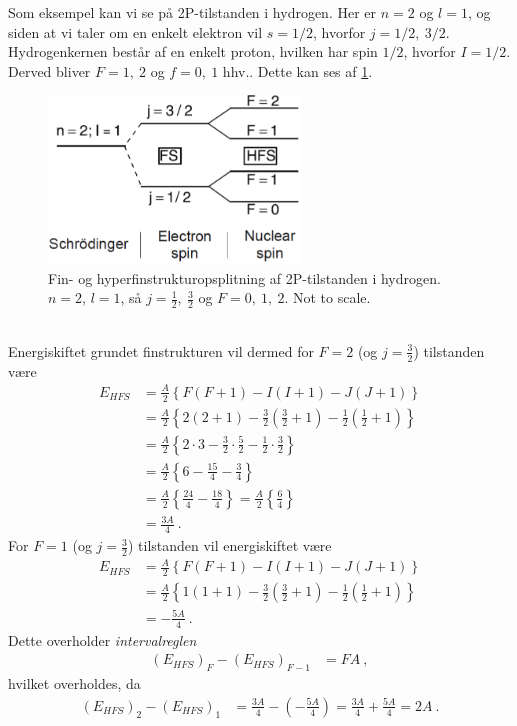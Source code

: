Som eksempel kan vi se på 2P-tilstanden i hydrogen. Her er $n = 2$ og $l = 1$, og siden at vi taler om en enkelt elektron vil $s = 1/2$, hvorfor $j = 1/2,\: 3/2$. Hydrogenkernen består af en enkelt proton, hvilken har spin $1/2$, hvorfor $I = 1/2$. Derved bliver $F = 1,\: 2$ og $f = 0,\: 1$ hhv.. Dette kan ses af \cref{fig:Q16_HyperFineSplittingOf2PstateInHydrogen}.
\begin{figure}[!h]
    \centering
    \includegraphics[width=0.60\textwidth]{Q16/images/HyperFineSplittingOf2PstateInHydrogen.PNG}
    \caption{Fin- og hyperfinstrukturopsplitning af 2P-tilstanden i hydrogen. $n = 2$, $l = 1$, så $j = \frac{1}{2}, \: \frac{3}{2}$ og $F = 0,\: 1,\: 2$. Not to scale.}
    \label{fig:Q16_HyperFineSplittingOf2PstateInHydrogen}
\end{figure}\\
Energiskiftet grundet finstrukturen vil dermed for $F = 2$ (og $j = \frac{3}{2}$) tilstanden være
\begin{align}
    E_{HFS} &= \frac{A}{2} \left\{F(F+1) - I(I+1) - J(J+1)\right\} \nonumber\\
    &= \frac{A}{2} \left\{2(2+1) - \frac{3}{2}(\frac{3}{2}+1) - \frac{1}{2}(\frac{1}{2}+1)\right\} \nonumber\\
    &= \frac{A}{2} \left\{2 \cdot 3 - \frac{3}{2} \cdot \frac{5}{2} - \frac{1}{2} \cdot \frac{3}{2}\right\} \nonumber\\
    &= \frac{A}{2} \left\{6 - \frac{15}{4} - \frac{3}{4}\right\} \nonumber\\
    &= \frac{A}{2} \left\{\frac{24}{4} - \frac{18}{4}\right\}
    = \frac{A}{2} \left\{\frac{6}{4}\right\} \nonumber\\
    &= \frac{3A}{4} \: .
\end{align}
For $F = 1$ (og $j = \frac{3}{2}$) tilstanden vil energiskiftet være
\begin{align}
    E_{HFS} &= \frac{A}{2} \left\{F(F+1) - I(I+1) - J(J+1)\right\} \nonumber\\
    &= \frac{A}{2} \left\{1(1+1) - \frac{3}{2}(\frac{3}{2}+1) - \frac{1}{2}(\frac{1}{2}+1)\right\} \nonumber\\
    &= -\frac{5A}{4} \: .
\end{align}
Dette overholder \emph{intervalreglen}
\begin{align}
    (E_{HFS})_F - (E_{HFS})_{F-1} &= FA \: ,
\end{align}
hvilket overholdes, da
\begin{align}
    (E_{HFS})_2 - (E_{HFS})_1 &= \frac{3A}{4} - \left(-\frac{5A}{4}\right) = \frac{3A}{4} + \frac{5A}{4} = 2A \: .
\end{align}